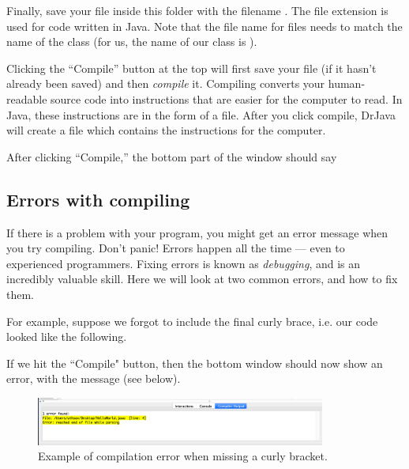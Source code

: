 Finally, save your file inside this folder with the filename . The  file extension is used for code written in Java. 
Note that the file name for  files needs to match the name of the class (for us, the name of our class is ).

Clicking the ``Compile'' button at the top will first save your file (if it hasn't already been saved) and then \emph{compile} it. Compiling converts your human-readable
source code into instructions that are easier for the computer to read. In Java, these instructions are in the form of a  file. After you click compile, DrJava will create a
 file which contains the instructions for the computer.


After clicking ``Compile,'' the bottom part of the window should say

\subsection{Errors with compiling}

If there is a problem with your program, you might get an error message when you try compiling. Don't panic! Errors happen all the time --- even to experienced programmers. Fixing errors is known as \emph{debugging}, and is an incredibly valuable skill. Here we will look at two common errors, and how to fix them. 

For example, suppose we forgot to include the final curly brace, i.e. our code looked like the following.

\begin{code}
class HelloWorld {
    
    public static void main(String[] args) {
        System.out.println("Hello World!");
    }
\end{code}

If we hit the  ``Compile" button, then the bottom window should now show an error, with the message  (see below).

\begin{figure}[ht]
	\centering
	\includegraphics[width=0.85\textwidth]{images/hello_world_error.png}
	\caption{Example of compilation error when missing a curly bracket.}
	\label{fig:helloworld:sec:error}
\end{figure}

